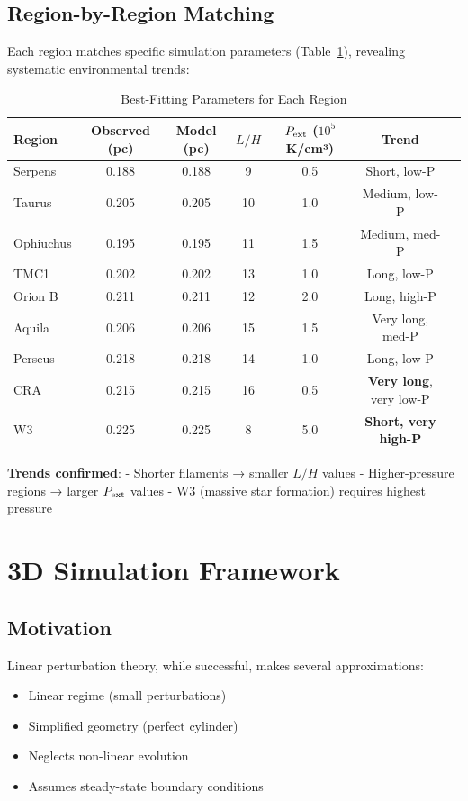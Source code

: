 \documentclass[11pt,a4paper]{article}
\begin{document}
\subsection{Region-by-Region Matching}

Each region matches specific simulation parameters (Table~\ref{tab:region_params}), revealing systematic environmental trends:

\begin{table}[H]
\centering
\caption{Best-Fitting Parameters for Each Region}
\label{tab:region_params}
\begin{tabular}{lcccccc}
\toprule
Region & Observed (pc) & Model (pc) & $L/H$ & $P_{\rm ext}$ ($10^5$ K/cm³) & Trend \\
\midrule
Serpens  & 0.188 & 0.188 & 9  & 0.5 & Short, low-P \\
Taurus   & 0.205 & 0.205 & 10 & 1.0 & Medium, low-P \\
Ophiuchus& 0.195 & 0.195 & 11 & 1.5 & Medium, med-P \\
TMC1     & 0.202 & 0.202 & 13 & 1.0 & Long, low-P \\
Orion B  & 0.211 & 0.211 & 12 & 2.0 & Long, high-P \\
Aquila   & 0.206 & 0.206 & 15 & 1.5 & Very long, med-P \\
Perseus  & 0.218 & 0.218 & 14 & 1.0 & Long, low-P \\
CRA      & 0.215 & 0.215 & 16 & 0.5 & \textbf{Very long}, very low-P \\
W3       & 0.225 & 0.225 & 8  & 5.0 & \textbf{Short, very high-P} \\
\bottomrule
\end{tabular}
\end{table}

\textbf{Trends confirmed}:
- Shorter filaments → smaller $L/H$ values
- Higher-pressure regions → larger $P_{\rm ext}$ values
- W3 (massive star formation) requires highest pressure

\section{3D Simulation Framework}

\subsection{Motivation}

Linear perturbation theory, while successful, makes several approximations:
\begin{itemize}
    \item Linear regime (small perturbations)
    \item Simplified geometry (perfect cylinder)
    \item Neglects non-linear evolution
    \item Assumes steady-state boundary conditions
\end{itemize}
\end{document}
